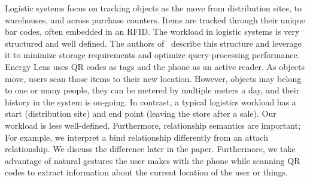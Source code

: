 Logistic systems focus on tracking objects as the move from distribution sites, to warehouses, and across purchase counters.  
Items are tracked through their unique bar codes, often embedded in an RFID.  The workload in logistic systems is very structured 
and well defined.  The authors of~\cite{rfid_gonz2006} describe this structure and leverage it to minimize storage
requirements and optimize query-processing performance.  Energy Lens uses QR codes as tags and the phone as an active
reader.  As objects move, users scan those items to their new location.  However, objects may belong to one or
many people, they can be metered by multiple meters a day, and their history in the system
is on-going.  In contrast, a typical logistics workload has a start (distribution site) and end point (leaving the store
after a sale).  Our workload is less well-defined.  Furthermore, relationship semantics are important; 
For example, we interpret a bind relationship differently from an attach relationship.  We discuss the difference
later in the paper.
Furthermore, we take advantage of natural gestures the user makes with the phone while scanning QR codes to extract
information about the current location of the user or things.

